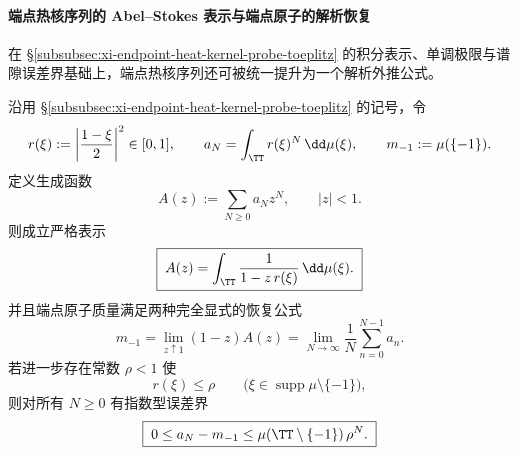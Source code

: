 \paragraph{端点热核序列的 Abel--Stokes 表示与端点原子的解析恢复}
在 \S\ref{subsubsec:xi-endpoint-heat-kernel-probe-toeplitz} 的积分表示、单调极限与谱隙误差界基础上，端点热核序列还可被统一提升为一个解析外推公式。

\begin{theorem}\label{thm:xi-endpoint-heat-probe-abel-stokes-atom-recovery}
沿用 \S\ref{subsubsec:xi-endpoint-heat-kernel-probe-toeplitz} 的记号，令
\[
r(\xi):=\left|\frac{1-\xi}{2}\right|^2\in[0,1],
\qquad
a_N=\int_{\TT}r(\xi)^N\,\dd\mu(\xi),
\qquad
m_{-1}:=\mu(\{-1\}).
\]
定义生成函数
\[
A(z):=\sum_{N\ge 0}a_N z^N,\qquad |z|<1.
\]
则成立严格表示
\begin{equation}\label{eq:xi-endpoint-heat-probe-abel-stokes-genfun}
\boxed{\;
A(z)=\int_{\TT}\frac{1}{1-z\,r(\xi)}\,\dd\mu(\xi).\;}
\end{equation}
并且端点原子质量满足两种完全显式的恢复公式
\begin{equation}\label{eq:xi-endpoint-heat-probe-abel-stokes-recovery}
\boxed{\;
m_{-1}
=
\lim_{z\uparrow 1}(1-z)A(z)
=
\lim_{N\to\infty}\frac1N\sum_{n=0}^{N-1}a_n.\;}
\end{equation}
若进一步存在常数 \(\rho<1\) 使
\[
r(\xi)\le \rho
\qquad
\bigl(\xi\in\operatorname{supp}\mu\setminus\{-1\}\bigr),
\]
则对所有 \(N\ge 0\) 有指数型误差界
\begin{equation}\label{eq:xi-endpoint-heat-probe-abel-stokes-exp-bound}
\boxed{\;
0\le a_N-m_{-1}\le \mu(\TT\setminus\{-1\})\,\rho^N.\;}
\end{equation}
\end{theorem}

